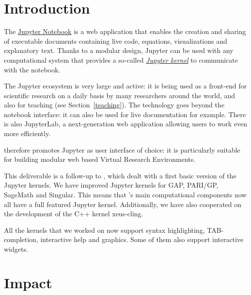 \documentclass{deliverablereport}
\author{Jeroen Demeyer, Sebastian Gutsche, Nicolas M.~Thiéry}
\begin{document}
\maketitle
\tableofcontents


\section{Introduction}

The \href{https://jupyter.org}{Jupyter Notebook} is a web application
that enables the creation and sharing of executable documents
containing live code, equations, visualizations and explanatory text.
Thanks to a modular design, Jupyter can be used with any computational
system that provides a so-called
\href{https://jupyter.readthedocs.io/en/latest/projects/kernels.html}{\emph{Jupyter kernel}}
to communicate with the notebook.

The Jupyter ecosystem is very large and active:
it is being used as a front-end for scientific research
on a daily basis by many researchers around the world,
and also for teaching (see Section~\ref{teaching}).
The technology goes beyond the notebook interface:
it can also be used for live documentation for example.
There is also JupyterLab, a next-generation web application
allowing users to work even more efficiently.

\ODK therefore promotes Jupyter as user interface of choice:
it is particularly suitable for building modular web based Virtual Research Environments.

This deliverable is a follow-up to ,
which dealt with a first basic version of the Jupyter kernels.
We have improved Jupyter kernels for GAP, PARI/GP, SageMath and Singular.
This means that \ODK's main computational components
now all have a full featured Jupyter kernel.
Additionally, we have also cooperated on the development of the C++ kernel xeus-cling.

All the kernels that we worked on now support syntax highlighting, TAB-completion,
interactive help and graphics. Some of them also support interactive widgets.


\section{Impact}
\end{document}

